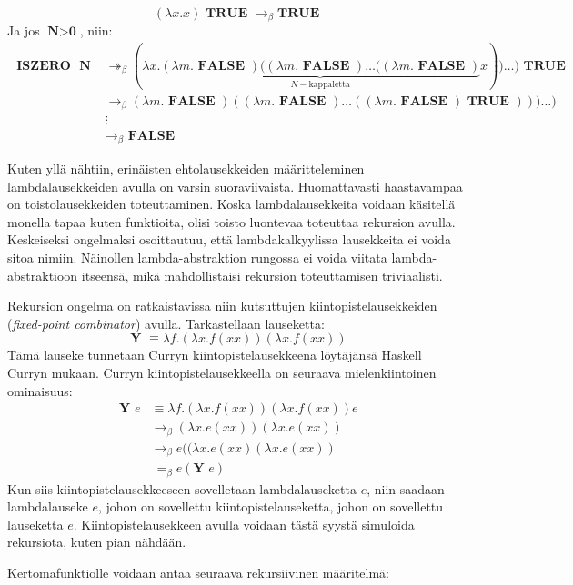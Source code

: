 \[ (\lambda x . x) \textbf{ TRUE } \rightarrow_{\beta} \textbf{TRUE} \]
Ja jos $\textbf{N} > \textbf{0}$, niin:
\begin{align*}
\textbf{ ISZERO } \textbf{ N } &\twoheadrightarrow_{\beta} (\lambda x . \underbrace{ (\lambda m . \textbf{ FALSE }) ( (\lambda m . \textbf{ FALSE }) \ldots ((\lambda m . \textbf{ FALSE }) }_{ N-\text{kappaletta}} x)) \ldots ) \textbf{ TRUE } \\
&\rightarrow_{\beta}  (\lambda m . \textbf{ FALSE }) ( (\lambda m . \textbf{ FALSE }) \ldots ((\lambda m . \textbf{ FALSE }) \textbf{ TRUE }) )) \ldots ) \\
&\vdots \\
&\rightarrow_{\beta} \textbf{ FALSE }
\end{align*}
\par
Kuten yllä nähtiin, erinäisten ehtolausekkeiden määritteleminen lambdalausekkeiden avulla on varsin suoraviivaista. Huomattavasti haastavampaa on toistolausekkeiden toteuttaminen. Koska lambdalausekkeita voidaan käsitellä monella tapaa kuten funktioita, olisi toisto luontevaa toteuttaa rekursion avulla. Keskeiseksi ongelmaksi osoittautuu, että lambdakalkyylissa lausekkeita ei voida sitoa nimiin. Näinollen lambda-abstraktion rungossa ei voida viitata lambda-abstraktioon itseensä, mikä mahdollistaisi rekursion toteuttamisen triviaalisti. 
\par 
Rekursion ongelma on ratkaistavissa niin kutsuttujen kiintopistelausekkeiden (\textit{fixed-point combinator}) avulla. Tarkastellaan lauseketta: 
\[ \textbf{ Y } \equiv \lambda f . (\lambda x . f(xx)) (\lambda x . f(xx)) \]
Tämä lauseke tunnetaan Curryn kiintopistelausekkeena löytäjänsä Haskell Curryn mukaan. Curryn kiintopistelausekkeella on seuraava mielenkiintoinen ominaisuus:
\begin{align*}
\textbf{ Y } e &\equiv \lambda f . (\lambda x . f(xx)) (\lambda x . f(xx)) e \\
&\rightarrow_{\beta} (\lambda x . e(xx)) (\lambda x . e(xx)) \\
&\rightarrow_{\beta} e((\lambda x . e(xx)(\lambda x . e(xx)) \\
&\ =_{\beta} e(\textbf{Y }e) 
\end{align*}
Kun siis kiintopistelausekkeeseen sovelletaan lambdalauseketta $e$, niin saadaan lambdalauseke $e$, johon on sovellettu kiintopistelauseketta, johon on sovellettu lauseketta $e$. Kiintopistelausekkeen avulla voidaan tästä syystä simuloida rekursiota, kuten pian nähdään.
\par
Kertomafunktiolle voidaan antaa seuraava rekursiivinen määritelmä:

